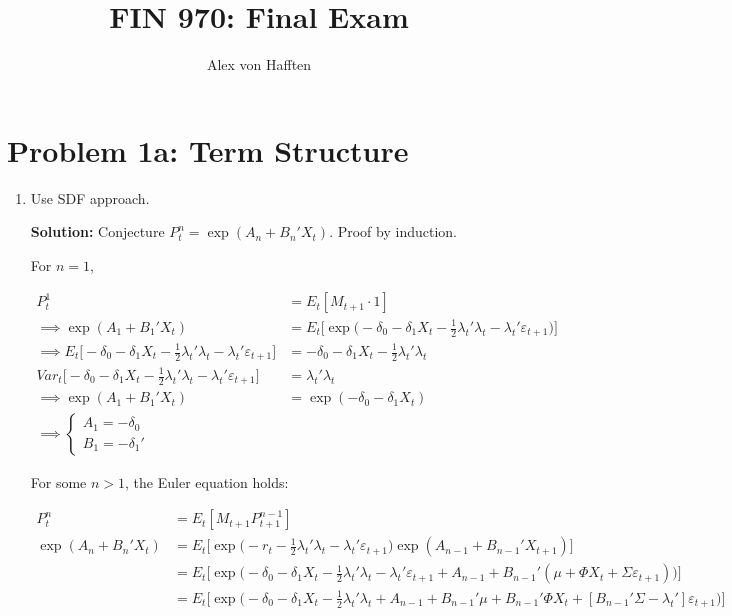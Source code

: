 \documentclass{article}
\title{FIN 970: Final Exam}
\author{Alex von Hafften}
\begin{document}
\maketitle

\section{Problem 1a: Term Structure}

\begin{enumerate}

\item Use SDF approach.

\textbf{Solution:} Conjecture $P_t^n = \exp(A_n + B_n'X_t)$. Proof by induction.

For $n=1$,

\begin{align*}
P_t^1 
&= 
E_t[M_{t+1} \cdot 1]\\
\implies\exp(A_1 + B_1'X_t) 
&= 
E_t \Bigg[ \exp \Bigg(-\delta_0 - \delta_1 X_t - \frac{1}{2} \lambda_t'\lambda_t - \lambda_t' \varepsilon_{t+1}\Bigg) \Bigg]\\
\implies E_t \Bigg[ -\delta_0 - \delta_1 X_t - \frac{1}{2} \lambda_t'\lambda_t - \lambda_t' \varepsilon_{t+1} \Bigg]
&= -\delta_0 -\delta_1 X_t - \frac{1}{2}\lambda_t'\lambda_t \\
Var_t\Bigg[ -\delta_0 - \delta_1 X_t - \frac{1}{2} \lambda_t'\lambda_t - \lambda_t' \varepsilon_{t+1} \Bigg]
&= \lambda_t'\lambda_t\\
\implies
\exp(A_1 + B_1'X_t) 
&= 
\exp (-\delta_0 - \delta_1 X_t ) \\
\implies
\begin{cases}
A_1 = -\delta_0\\
B_1 = -\delta_1'
\end{cases}
\end{align*}

For some $n>1$, the Euler equation holds:

\begin{align*}
P_t^n &= E_t[M_{t+1} P_{t+1}^{n-1}]\\
\exp(A_{n} + B_{n}'X_{t})
&= E_t \Bigg[\exp \Bigg(-r_t - \frac{1}{2} \lambda_t'\lambda_t - \lambda_t' \varepsilon_{t+1}\Bigg) \exp(A_{n-1} + B_{n-1}'X_{t+1})\Bigg]\\
&= E_t \Bigg[\exp \Bigg(-\delta_0 - \delta_1 X_t - \frac{1}{2} \lambda_t'\lambda_t - \lambda_t' \varepsilon_{t+1} + A_{n-1} + B_{n-1}'(\mu + \Phi X_t + \Sigma \varepsilon_{t+1} ) \Bigg)\Bigg]\\
&= E_t \Bigg[\exp \Bigg(-\delta_0 - \delta_1 X_t - \frac{1}{2} \lambda_t'\lambda_t  + A_{n-1} + B_{n-1}'\mu + B_{n-1}'\Phi X_t + [B_{n-1}'\Sigma - \lambda_t'] \varepsilon_{t+1}  \Bigg)\Bigg]
\end{align*}


\end{enumerate}
\end{document}
